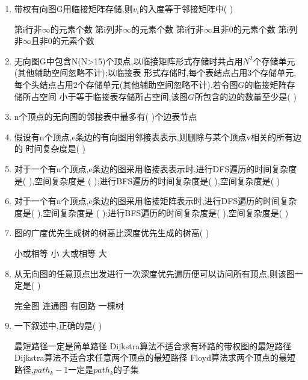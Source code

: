 \documentclass[12pt, a4paper, oneside, UTF8]{ctexbook}
\begin{document}
\begin{enumerate}
    \item 带权有向图G用临接矩阵存储,则$v_i$的入度等于邻接矩阵中(    )
    \begin{choices}[2]
        \task 第i行非$\infty$的元素个数
        \task 第i列非$\infty$的元素个数
        \task 第i行非$\infty$且非0的元素个数
        \task 第i列非$\infty$且非0的元素个数
    \end{choices}



    \item 无向图G中包含N(N>15)个顶点,以临接矩阵形式存储时共占用$N^2$个存储单元(其他辅助空间忽略不计);以临接表
    形式存储时,每个表结点占用3个存储单元,每个头结点占用2个存储单元(其他辅助空间忽略不计).若令图$G$的临接矩阵存储所占空间
    小于等于临接表存储所占空间,该图$G$所包含的边的数量至少是(   ) 

    \item n个顶点的无向图的邻接表中最多有(   )个边表节点
    

    \item 假设有n个顶点,e条边的有向图用邻接表表示,则删除与某个顶点v相关的所有边的
    时间复杂度是(    ) 



    \item 对于一个有n个顶点,e条边的图采用临接表表示时,进行DFS遍历的时间复杂度是(   ),空间复杂度是
    (   );进行BFS遍历的时间复杂度是(   ),空间复杂度是(    ) 


    \item 对于一个有n个顶点,e条边的图采用临接矩阵表示时,进行DFS遍历的时间复杂度是(   ),空间复杂度是
    (   );进行BFS遍历的时间复杂度是(   ),空间复杂度是(    ) 


    \item 图的广度优先生成树的树高比深度优先生成的树高(    ) 
    \begin{choices}
        \task 小或相等
        \task 小 
        \task 大或相等 
        \task 大
    \end{choices}



    \item 从无向图的任意顶点出发进行一次深度优先遍历便可以访问所有顶点,则该图一定是(   ) 
    \begin{choices}
        \task 完全图 
        \task 连通图 
        \task 有回路 
        \task 一棵树 
    \end{choices}



    \item 一下叙述中,正确的是(   ) 
    \begin{choices}[1]
        \task 最短路径一定是简单路径
        \task Dijkstra算法不适合求有环路的带权图的最短路径
        \task Dijkstra算法不适合求任意两个顶点的最短路径 
        \task Floyd算法求两个顶点的最短路径,$path_k-1$一定是$path_k$的子集 
    \end{choices}



\end{enumerate}
\end{document}
